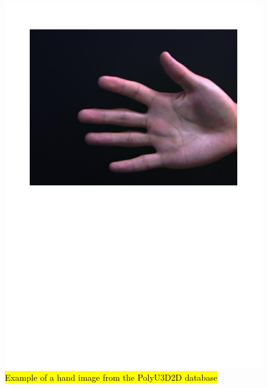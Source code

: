 \documentclass[review]{elsarticle}
\begin{document}
		\begin{figure}[h]
		    \centering
		    \includegraphics[page=1,scale=.57,trim=1cm 14.7cm 1cm 1.5cm,clip]{PolyU3D2D_samples.pdf}
		    \caption{\hl{Example of a hand image from the PolyU3D2D database}}
		    \label{fig:PolyU_hand1}
		\end{figure}
\end{document}
